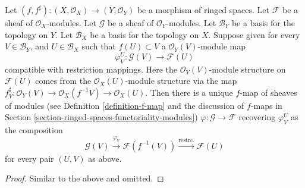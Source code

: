 \begin{lemma}
\label{lemma-f-map-basis-above-and-below-modules}
Let $(f, f^\sharp) : (X, \mathcal{O}_X) \to (Y, \mathcal{O}_Y)$
be a morphism of ringed spaces.
Let $\mathcal{F}$ be a sheaf of $\mathcal{O}_X$-modules.
Let $\mathcal{G}$ be a sheaf of $\mathcal{O}_Y$-modules.
Let $\mathcal{B}_Y$ be a basis for the topology on $Y$.
Let $\mathcal{B}_X$ be a basis for the topology on $X$.
Suppose given for every $V \in \mathcal{B}_Y$, and
$U \in \mathcal{B}_X$ such that $f(U) \subset V$ a
$\mathcal{O}_Y(V)$-module map
$$
\varphi_V^U :
\mathcal{G}(V)
\longrightarrow
\mathcal{F}(U)
$$
compatible with restriction mappings. Here the 
$\mathcal{O}_Y(V)$-module structure on $\mathcal{F}(U)$
comes from the $\mathcal{O}_X(U)$-module structure
via the map $f^\sharp_V : \mathcal{O}_Y(V) 
\to \mathcal{O}_X(f^{-1}V) \to \mathcal{O}_X(U)$.
Then there is a unique $f$-map of sheaves of modules (see
Definition \ref{definition-f-map} and the discussion
of $f$-maps in Section \ref{section-ringed-spaces-functoriality-modules})
$\varphi : \mathcal{G} \to \mathcal{F}$
recovering $\varphi_V^U$ as the composition
$$
\mathcal{G}(V) \xrightarrow{\varphi_V}
\mathcal{F}(f^{-1}(V)) \xrightarrow{\text{restrc.}}
\mathcal{F}(U)
$$
for every pair $(U, V)$ as above.
\end{lemma}

\begin{proof}
Similar to the above and omitted.
\end{proof}










